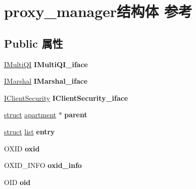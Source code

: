 \hypertarget{structproxy__manager}{}\section{proxy\+\_\+manager结构体 参考}
\label{structproxy__manager}
\subsection*{Public 属性}
\begin{DoxyCompactItemize}
\item 
\mbox{\label{structproxy__manager_a7967f2cb392c2dd933da4f4b305bf99f}} 
\hyperlink{interface_i_multi_q_i}{I\+Multi\+QI} {\bfseries I\+Multi\+Q\+I\+\_\+iface}
\item 
\mbox{\label{structproxy__manager_a92d7f863e8840b303fb47d837f98927e}} 
\hyperlink{interface_i_marshal}{I\+Marshal} {\bfseries I\+Marshal\+\_\+iface}
\item 
\mbox{\label{structproxy__manager_a28741ae8888285396651c362bfa04c61}} 
\hyperlink{interface_i_client_security}{I\+Client\+Security} {\bfseries I\+Client\+Security\+\_\+iface}
\item 
\mbox{\label{structproxy__manager_aa391c5d84db351213475f2f2c0a3617c}} 
\hyperlink{interfacestruct}{struct} \hyperlink{structapartment}{apartment} $\ast$ {\bfseries parent}
\item 
\mbox{\label{structproxy__manager_aa72fd4e03749eed304e3f019b6988a32}} 
\hyperlink{interfacestruct}{struct} \hyperlink{classlist}{list} {\bfseries entry}
\item 
\mbox{\label{structproxy__manager_a9cb04016ffdedb068563352ce4423aa6}} 
O\+X\+ID {\bfseries oxid}
\item 
\mbox{\label{structproxy__manager_a50864726fef17e8edaffac040a792244}} 
O\+X\+I\+D\+\_\+\+I\+N\+FO {\bfseries oxid\+\_\+info}
\item 
\mbox{\label{structproxy__manager_a4e23f68728eddd603da39f914b0ba807}} 
O\+ID {\bfseries oid}

\end{DoxyCompactItemize}
